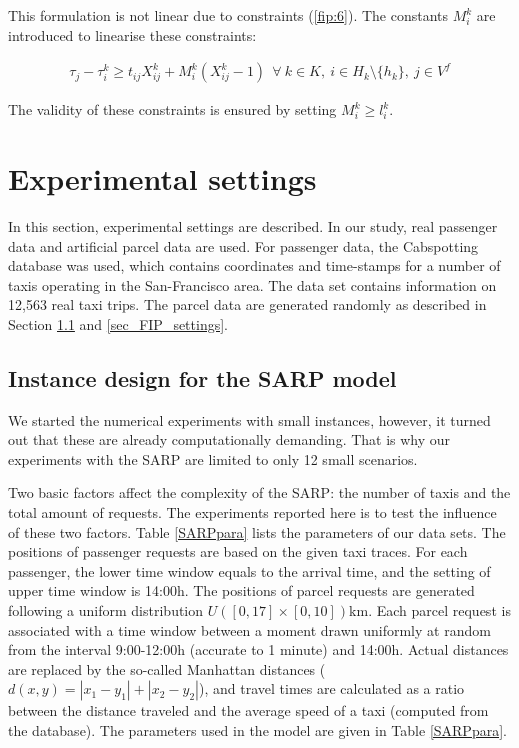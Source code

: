 \documentclass[preprint,authoryear,12pt]{elsarticle}
\begin{document}
This formulation is not linear due to constraints (\ref{fip:6}). The constants $M_{i}^{k}$ are introduced to linearise these constraints:

\begin{eqnarray}
\tau_j -\tau_i^k\geq  t_{ij} X_{ij}^k+M_{i}^{k}(X_{ij}^{k}-1)    ~~\forall~k\in K,~i\in H_k\setminus \{h_k\} ,~j\in V^{f} \label{fip:12}
\end{eqnarray}

The validity of these constraints is ensured by setting $M_{i}^{k}\geq l_i^k$.



\section{Experimental settings}
\label{sec_settings}
In this section, experimental settings are described. In our study, real passenger data and artificial parcel data are used. For passenger data, the Cabspotting database \citep{TaxiSFOnline} was used, which contains coordinates and time-stamps for a number of taxis operating in the San-Francisco area. The data set contains information on 12,563 real taxi trips. The parcel data are generated randomly as described in Section \ref{sec_SARP_settings} and \ref{sec_FIP_settings}.


\subsection{Instance design for the SARP model}
\label{sec_SARP_settings}
We started the numerical experiments with small instances, however, it turned out that these are already computationally demanding. That is why our experiments with the SARP are limited to only 12 small scenarios. 

Two basic factors affect the complexity of the SARP: the number of taxis and the total amount of requests. The experiments reported here is to test the influence of these two factors. Table \ref{SARPpara} lists the parameters of our data sets. The positions of passenger requests are based on the given taxi traces. For each passenger, the lower time window equals to the arrival time, and the setting of upper time window is 14:00h. The positions of parcel requests are generated following a uniform distribution $U([0,17]\times[0,10])$km. Each parcel request is associated with a time window between a moment drawn uniformly at random from the interval 9:00-12:00h (accurate to 1 minute) and 14:00h. Actual distances are replaced by the so-called Manhattan distances  ($d(x,y)=|x_1-y_1|+|x_2-y_2|$), and travel times are calculated as a ratio between the distance traveled and the average speed of a taxi (computed from the database). The parameters used in the model are given in Table \ref{SARPpara}.
\end{document}
